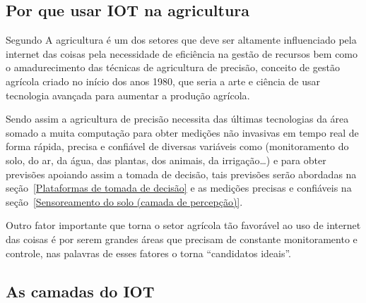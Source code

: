 \documentclass[
article,			%
12pt,				%
oneside,			%
a4paper,			%
english,			%
brazil,				%
sumario=tradicional
]{abntex2}
\begin{document}
\subsection{Por que usar IOT na agricultura}\label{Por que usar IOT na agricultura}
Segundo \citeauthor{5} A agricultura é um dos setores que deve ser altamente influenciado pela internet das coisas pela necessidade de eficiência na gestão de recursos bem como o amadurecimento das técnicas de agricultura de precisão, conceito de gestão agrícola criado no início dos anos 1980\cite{4}, que seria a arte e ciência de usar tecnologia avançada para aumentar a produção agrícola\cite{9}.

Sendo assim a agricultura de precisão necessita das últimas tecnologias da área somado a muita computação para obter medições não invasivas em tempo real de forma rápida, precisa e confiável de diversas variáveis como (monitoramento do solo, do ar, da água, das plantas, dos animais, da irrigação\ldots)\cite{10} e para obter previsões apoiando assim a tomada de decisão, tais previsões serão abordadas na seção~\ref{Plataformas de tomada de decisão} e as medições precisas e confiáveis na seção~\ref{Sensoreamento do solo (camada de percepção)}.

Outro fator importante que torna o setor agrícola tão favorável ao uso de internet das coisas é por serem grandes áreas que precisam de constante monitoramento e controle, nas palavras de \citeauthor{10} esses fatores o torna ``candidatos ideais''.

\subsection{As camadas do IOT}\label{As camadas do IOT}
\end{document}
